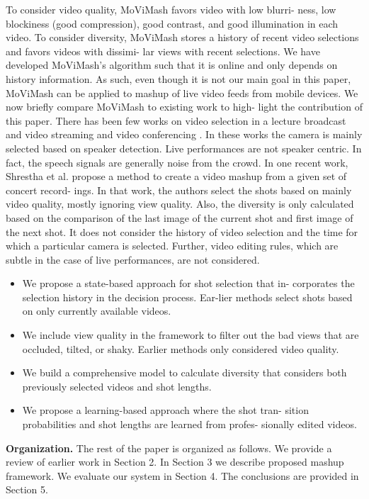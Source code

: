 \documentclass{sig-alternate}
\begin{document}
To consider video quality, MoViMash favors video with low blurri-
ness, low blockiness (good compression), good contrast, and good
illumination in each video. To consider diversity, MoViMash stores
a history of recent video selections and favors videos with dissimi-
lar views with recent selections.
We have developed MoViMash’s algorithm such that it is online
and only depends on history information. As such, even though
it is not our main goal in this paper, MoViMash can be applied to
mashup of live video feeds from mobile devices.
We now briefly compare MoViMash to existing work to high-
light the contribution of this paper. There has been few works on
video selection in a lecture broadcast and video streaming \cite{salas:twentyone} \cite{salas:six}
and video conferencing \cite{salas:three}. In these works the camera is mainly
selected based on speaker detection. Live performances are not
speaker centric. In fact, the speech signals are generally noise from
the crowd. In one recent work, Shrestha et al. \cite{salas:fifteen} propose a
method to create a video mashup from a given set of concert record-
ings. In that work, the authors select the shots based on mainly
video quality, mostly ignoring view quality. Also, the diversity is
only calculated based on the comparison of the last image of the
current shot and first image of the next shot. It does not consider
the history of video selection and the time for which a particular
camera is selected. Further, video editing rules, which are subtle in
the case of live performances, are not considered.


\begin{itemize}
\item We propose a state-based approach for shot selection that in-
corporates the selection history in the decision process. Ear-lier methods select shots based on only currently available
videos.
\item We include view quality in the framework to filter out the
bad views that are occluded, tilted, or shaky. Earlier methods
only considered video quality.
\item We build a comprehensive model to calculate diversity that
considers both previously selected videos and shot lengths.
\item We propose a learning-based approach where the shot tran-
sition probabilities and shot lengths are learned from profes-
sionally edited videos.
\end{itemize}

\textbf{Organization.} The rest of the paper is organized as follows.
We provide a review of earlier work in Section 2. In Section 3 we
describe proposed mashup framework. We evaluate our system in
Section 4. The conclusions are provided in Section 5.
\end{document}
